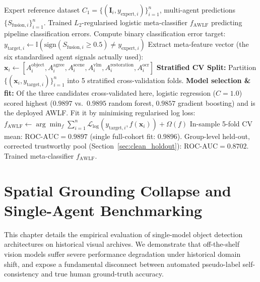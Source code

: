 \documentclass[12pt,a4paper]{report}
\begin{document}
\begin{algorithm}[!htbp]
\caption{Agreement-Weighted Label Filter (AWLF v2 Error Retraining)}
\label{alg:awlf_v2}
\begin{algorithmic}[1]
\Require Expert reference dataset $C_1 = \{(\mathbf{I}_i, y_{\text{expert}, i})\}_{i=1}^n$, multi-agent predictions $\{S_{\text{fusion}, i}\}_{i=1}^n$.
\Ensure Trained $L_2$-regularised logistic meta-classifier $f_{\text{AWLF}}$ predicting pipeline classification errors.
    \State Compute binary classification error target: $y_{\text{target}, i} \leftarrow \mathbb{I}(\text{sign}(S_{\text{fusion}, i} \ge 0.5) \neq y_{\text{expert}, i})$
    \State Extract meta-feature vector (the six standardised agent signals actually used): $\mathbf{x}_i \leftarrow [A_i^{\text{object}}, A_i^{\text{agree}}, A_i^{\text{scene}}, A_i^{\text{vlm}}, A_i^{\text{restoration}}, A_i^{\text{ocr}}]$
\EndFor
\State \textbf{Stratified CV Split:} Partition $\{(\mathbf{x}_i, y_{\text{target}, i})\}_{i=1}^n$ into 5 stratified cross-validation folds.
\State \textbf{Model selection \& fit:} Of the three candidates cross-validated here, logistic regression ($C{=}1.0$) scored highest ($0.9897$ vs.\ $0.9895$ random forest, $0.9857$ gradient boosting) and is the deployed AWLF. Fit it by minimising regularised log loss:
\State \quad $f_{\text{AWLF}} \leftarrow \arg\min_f \sum_{i=1}^n \mathcal{L}_{\text{log}}(y_{\text{target}, i}, f(\mathbf{x}_i)) + \Omega(f)$
\State In-sample 5-fold CV mean: $\text{ROC-AUC} = 0.9897$ (single full-cohort fit: $0.9896$). Group-level held-out, corrected trustworthy pool (Section~\ref{sec:clean_holdout}): $\text{ROC-AUC} = 0.8702$.
\State \Return Trained meta-classifier $f_{\text{AWLF}}$.
\end{algorithmic}
\end{algorithm}

\chapter{Spatial Grounding Collapse and Single-Agent Benchmarking}
\label{ch:spatial_collapse}

This chapter details the empirical evaluation of single-model object detection architectures on historical visual archives. We demonstrate that off-the-shelf vision models suffer severe performance degradation under historical domain shift, and expose a fundamental disconnect between automated pseudo-label self-consistency and true human ground-truth accuracy.
\end{document}
